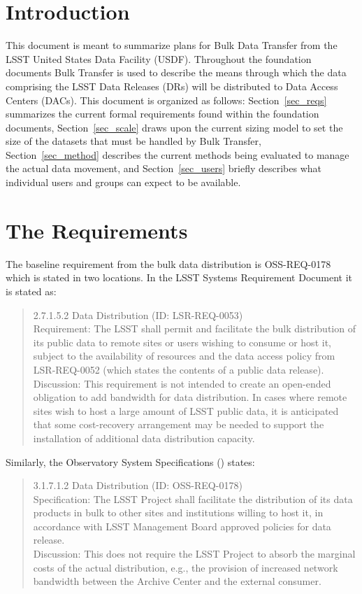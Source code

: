 \section{Introduction}

This document is meant to summarize plans for Bulk Data Transfer from the LSST United States Data Facility (USDF).
Throughout the foundation documents Bulk Transfer is used to describe the means through which the data comprising
the LSST Data Releases (DRs) will be distributed to Data Access Centers (DACs).  This document is organized as follows:
Section~\ref{sec_reqs} summarizes the current formal requirements found within the foundation documents, Section~\ref{sec_scale}
draws upon the current sizing model to set the size of the datasets that must be handled by Bulk Transfer, Section~\ref{sec_method}
describes the current methods being evaluated to manage the actual data movement, and Section~\ref{sec_users} briefly 
describes what individual users and groups can expect to be available.

\section{The Requirements\label{sec_reqs}}

The baseline requirement from the bulk data distribution is OSS-REQ-0178 which is stated in two locations.  
In the LSST Systems Requirement Document  it is stated as:

\begin{quote}
2.7.1.5.2 Data Distribution (ID: LSR-REQ-0053)\\
Requirement: The LSST shall permit and facilitate the bulk distribution of its public data to 
remote sites or users wishing to consume or host it, subject to the availability of resources and the data
access policy from LSR-REQ-0052 (which states the contents of a public data release).\\
Discussion: This requirement is not intended to create an open-ended obligation to add bandwidth for data distribution. In cases where remote sites wish to host a large amount of LSST public data, it is anticipated that some cost-recovery arrangement may be needed to support the installation of additional data distribution capacity.\\
\end{quote}

Similarly, the Observatory System Specifications () states:
\begin{quote}
3.1.7.1.2 Data Distribution (ID: OSS-REQ-0178)\\
Specification: The LSST Project shall facilitate the distribution of its data products in bulk to other sites and institutions willing to host it, in accordance with LSST Management Board approved policies for data release.\\
Discussion: This does not require the LSST Project to absorb the marginal costs of the actual distribution, e.g., the provision of increased network bandwidth between the Archive Center and the external consumer.\\
\end{quote}

